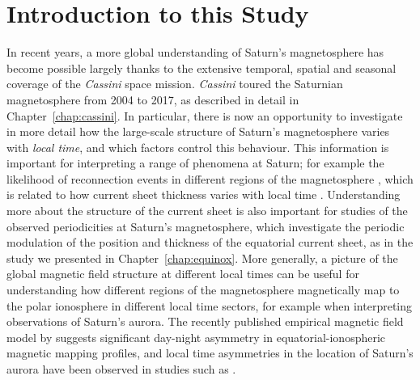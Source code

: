 \section{Introduction to this Study}\label{LTsectors:sec:intro}
In recent years, a more global understanding of Saturn's magnetosphere has become possible largely thanks to the extensive temporal, spatial and seasonal coverage of the \textit{Cassini} space mission. \textit{Cassini} toured the Saturnian magnetosphere from 2004 to 2017, as described in detail in Chapter~\ref{chap:cassini}. In particular, there is now an opportunity to investigate in more detail how the large-scale structure of Saturn's magnetosphere varies with \textit{local time}, and which factors control this behaviour. This information is important for interpreting a range of phenomena at Saturn; for example the likelihood of reconnection events in different regions of the magnetosphere \citep{delamere2015}, which is related to how current sheet thickness varies with local time \citep{kellett2011}. Understanding more about the structure of the current sheet is also important for studies of the observed periodicities at Saturn's magnetosphere, which investigate the periodic modulation of the position and thickness of the equatorial current sheet, as in the study we presented in Chapter~\ref{chap:equinox}. More generally, a picture of the global magnetic field structure at different local times can be useful for understanding how different regions of the magnetosphere magnetically map to the polar ionosphere in different local time sectors, for example when interpreting observations of Saturn's aurora. The recently published empirical magnetic field model by \citet{carbary2018} suggests significant day-night asymmetry in equatorial-ionospheric magnetic mapping profiles, and local time asymmetries in the location of Saturn's aurora have been observed in studies such as \citet{badman2006,badman2011}.

